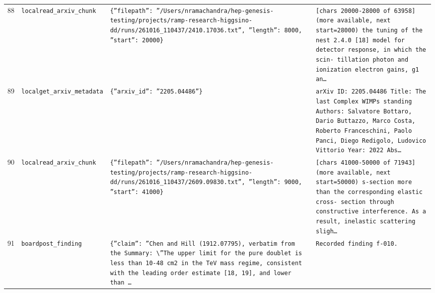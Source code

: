 \documentclass[11pt,a4paper]{article}
\begin{document}
\begin{longtable}{@{}p{}p{}p{}p{}@{}}
88 & \texttt{local}\newline\texttt{read\_\allowbreak{}arxiv\_\allowbreak{}chunk} & \texttt{\{''filepath'':\allowbreak{} ''/\allowbreak{}Users/\allowbreak{}nramachandra/\allowbreak{}hep-genesis-testing/\allowbreak{}projects/\allowbreak{}ramp-research-higgsino-dd/\allowbreak{}runs/\allowbreak{}261016\_\allowbreak{}110437/\allowbreak{}2410.17036.txt'',\allowbreak{} ''length'':\allowbreak{} 8000,\allowbreak{} ''start'':\allowbreak{} 20000\}\allowbreak{}} & \texttt{[chars 20000-28000 of 63958]\allowbreak{} (more available,\allowbreak{} next start=\allowbreak{}28000)\allowbreak{}  the tuning of the nest 2.4.0 [18]\allowbreak{} model for detector response,\allowbreak{} in which the scin- tillation photon and ionization electron gains,\allowbreak{} g1 an\ldots{}\allowbreak{}} \\
89 & \texttt{local}\newline\texttt{get\_\allowbreak{}arxiv\_\allowbreak{}metadata} & \texttt{\{''arxiv\_\allowbreak{}id'':\allowbreak{} ''2205.04486''\}\allowbreak{}} & \texttt{arXiv ID:\allowbreak{} 2205.04486 Title:\allowbreak{} The last Complex WIMPs standing Authors:\allowbreak{} Salvatore Bottaro,\allowbreak{} Dario Buttazzo,\allowbreak{} Marco Costa,\allowbreak{} Roberto Franceschini,\allowbreak{} Paolo Panci,\allowbreak{} Diego Redigolo,\allowbreak{} Ludovico Vittorio Year:\allowbreak{} 2022 Abs\ldots{}\allowbreak{}} \\
90 & \texttt{local}\newline\texttt{read\_\allowbreak{}arxiv\_\allowbreak{}chunk} & \texttt{\{''filepath'':\allowbreak{} ''/\allowbreak{}Users/\allowbreak{}nramachandra/\allowbreak{}hep-genesis-testing/\allowbreak{}projects/\allowbreak{}ramp-research-higgsino-dd/\allowbreak{}runs/\allowbreak{}261016\_\allowbreak{}110437/\allowbreak{}2609.09830.txt'',\allowbreak{} ''length'':\allowbreak{} 9000,\allowbreak{} ''start'':\allowbreak{} 41000\}\allowbreak{}} & \texttt{[chars 41000-50000 of 71943]\allowbreak{} (more available,\allowbreak{} next start=\allowbreak{}50000)\allowbreak{}  s-section more than the corresponding elastic cross- section through constructive interference. As a result,\allowbreak{} inelastic scattering sligh\ldots{}\allowbreak{}} \\
91 & \texttt{board}\newline\texttt{post\_\allowbreak{}finding} & \texttt{\{''claim'':\allowbreak{} ''Chen and Hill (1912.07795)\allowbreak{},\allowbreak{} verbatim from the Summary:\allowbreak{} \textbackslash{}\allowbreak{}''The upper limit for the pure doublet is less than 10-48 cm2 in the TeV mass regime,\allowbreak{} consistent with the leading order estimate [18,\allowbreak{} 19]\allowbreak{},\allowbreak{} and lower than \ldots{}\allowbreak{}} & \texttt{Recorded finding f-010.} \\

\end{longtable}
\end{document}
